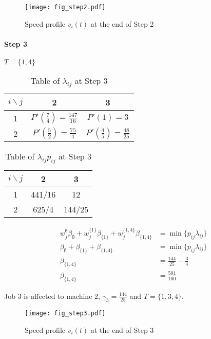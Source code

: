 \documentclass[11pt,a4paper]{article}
\begin{document}
\begin{figure}[H]
\begin{center}
\texttt{[image: fig\_step2.pdf]} 
\end{center}
\caption{Speed profile $v_i(t)$ at the end of Step 2}
\label{speed_profile_step2}
\end{figure}



\paragraph{Step 3}

$T=\{ 1,4  \}$\\

\begin{table}[H]
\centering
\begin{tabular}{|c|c|c|}
\hline 
$i \backslash j$  & 2 & 3  \\ 
\hline 
1  & $P'(\frac{7}{4})=\frac{147}{16}$ & $P'(1)=3$  \\ 
\hline 
2 & $P'(\frac{5}{2})=\frac{75}{4}$ & $P'(\frac{4}{5})=\frac{48}{25}$  \\ 
\hline 
\end{tabular} 
\caption{Table of $\lambda_{ij}$ at Step 3}
\end{table}


\begin{table}[H]
\centering
\begin{tabular}{|c|c|c|}
\hline 
$i \backslash j$ & 2 & 3 \\ 
\hline 
1 & 441/16 & 12  \\ 
\hline 
2  & 625/4 & 144/25 \\ 
\hline 
\end{tabular} 
\caption{Table of $\lambda_{ij}p_{ij}$ at Step 3}
\end{table}


\begin{align*}
w^{\emptyset}_{j} \beta_{\emptyset}
	+w^{\{ 1 \}}_{j} \beta_{\{ 1 \}}
	+w^{\{ 1,4 \}}_{j} \beta_{\{ 1,4\}}&=\min \{ p_{ij}\lambda_{ij}   \} \\
 \beta_{\emptyset}+\beta_{\{ 1 \}}
+\beta_{\{ 1,4\}}&=\min \{ p_{ij}\lambda_{ij}   \}\\
\beta_{\{ 1,4 \}}&=\frac{144}{25}-\frac{3}{4}\\
\beta_{\{ 1,4 \}}&=\frac{501}{100}
\end{align*}



Job 3 is affected to machine 2, $\gamma_3=\frac{144}{25}$ and $T=\{ 1,3,4 \}$.


\begin{figure}[H]
\begin{center}
\texttt{[image: fig\_step3.pdf]} 
\end{center}
\caption{Speed profile $v_i(t)$ at the end of Step 3}
\label{speed_profile_step3}
\end{figure}
\end{document}
